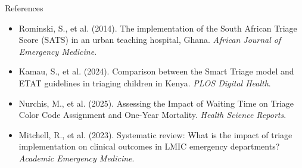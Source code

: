 \documentclass[11pt, aspectratio=169]{beamer}
\begin{document}
	\begin{frame}{References}
		\small
		\begin{itemize}
			\item[{[1]}] Rominski, S., et al. (2014). The implementation of the South African Triage Score (SATS) in an urban teaching hospital, Ghana. \textit{African Journal of Emergency Medicine}.
			\item[{[2]}] Kamau, S., et al. (2024). Comparison between the Smart Triage model and ETAT guidelines in triaging children in Kenya. \textit{PLOS Digital Health}.
			\item[{[3]}] Nurchis, M., et al. (2025). Assessing the Impact of Waiting Time on Triage Color Code Assignment and One-Year Mortality. \textit{Health Science Reports}.
			\item[{[4]}] Mitchell, R., et al. (2023). Systematic review: What is the impact of triage implementation on clinical outcomes in LMIC emergency departments? \textit{Academic Emergency Medicine}.
		\end{itemize}
	\end{frame}
	
\end{document}
